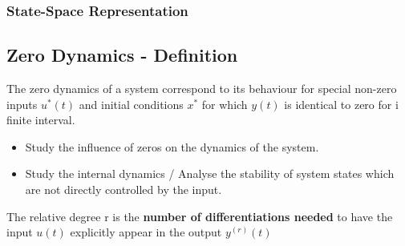 \documentclass[10pt,a4paper]{scrartcl}
\begin{document}
\begin{multicols*}{3}
\subsubsection*{State-Space Representation}



\vfill

\null

\columnbreak

\subsection{Zero Dynamics - Definition}

The zero dynamics of a system correspond to its behaviour for special non-zero inputs $u^\ast(t)$ and initial conditions $x^\ast$ for which $y(t)$ is identical to zero for i finite interval.

\begin{itemize}
\ncompaq
\item Study the influence of zeros on the dynamics of the system.
\item Study the internal dynamics / Analyse the stability of system states which are not directly controlled by the input.
\end{itemize}

The relative degree r is the \textbf{number of differentiations needed} to have the input $u(t)$ explicitly appear in the output $y^{(r)}(t)$


\end{multicols*}
\end{document}
